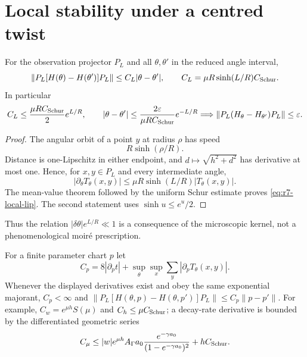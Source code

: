 \section{Local stability under a centred twist}
\label{sec:r7-twist}

\begin{theorem}
\label{thm:r7-twist}
For the observation projector $P_L$ and all $\theta,\theta'$ in the reduced
angle interval,
\begin{equation}
 \|P_L[H(\theta)-H(\theta')]P_L\|
 \le C_L|\theta-\theta'|,
 \qquad
 C_L=\mu R\sinh(L/R)C_{\rm Schur}.
 \label{eq:r7-local-lip}
\end{equation}
In particular
\begin{equation}
 C_L\le \frac{\mu R C_{\rm Schur}}2e^{L/R},\qquad
 |\theta-\theta'|\le
 \frac{2\varepsilon}{\mu R C_{\rm Schur}}e^{-L/R}
 \Longrightarrow
 \|P_L(H_\theta-H_{\theta'})P_L\|\le\varepsilon.
 \label{eq:r7-angle-scale}
\end{equation}
\end{theorem}

\begin{proof}
The angular orbit of a point $y$ at radius $\rho$ has speed
\begin{equation*}
 R\sinh(\rho/R).
\end{equation*}
Distance is one-Lipschitz in either
endpoint, and $d\mapsto\sqrt{h^2+d^2}$ has derivative at most one.  Hence,
for $x,y\in P_L$ and every intermediate angle,
\begin{equation}
 |\partial_\theta T_\theta(x,y)|
 \le\mu R\sinh(L/R)|T_\theta(x,y)|.
\end{equation}
The mean-value theorem followed by the uniform Schur estimate proves
\eqref{eq:r7-local-lip}.  The second statement uses
$\sinh u\le e^u/2$.
\end{proof}

Thus the relation $|\delta\theta|e^{L/R}\ll1$ is a consequence of the
microscopic kernel, not a phenomenological moir\'e prescription.

For a finite parameter chart $p$ let
\begin{equation}
 C_p=8|\partial_p t|+
 \sup_\theta\sup_x\sum_y|\partial_pT_\theta(x,y)|.
 \label{eq:r7-Cp}
\end{equation}
Whenever the displayed derivatives exist and obey the same exponential
majorant, $C_p<\infty$ and
$\|P_L[H(\theta,p)-H(\theta,p')]P_L\|
\le C_p\|p-p'\|$.  For example,
$C_w=e^{\mu h}S(\mu)$ and $C_h\le\mu C_{\rm Schur}$; a decay-rate derivative
is bounded by the differentiated geometric series
\begin{equation}
 C_\mu\le |w|e^{\mu h}A_\Gamma a_0
 \frac{e^{-\gamma a_0}}{(1-e^{-\gamma a_0})^2}
 +hC_{\rm Schur}.
\end{equation}
